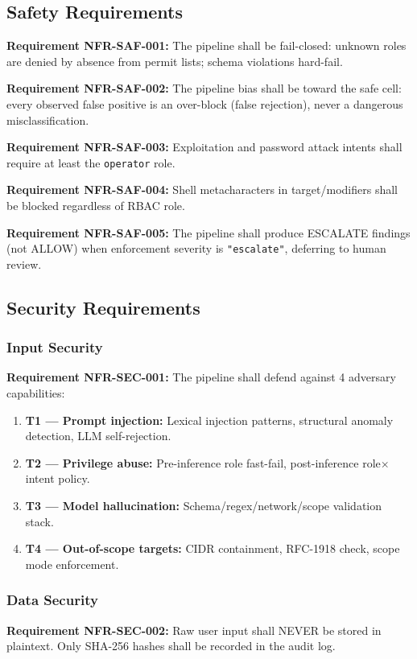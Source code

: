 \documentclass[10pt,journal,onecolumn]{IEEEtran}
\newcommand{\reqid}[1]{\textbf{#1}}
\begin{document}
\subsection{Safety Requirements}
\reqid{Requirement NFR-SAF-001:} The pipeline shall be fail-closed: unknown roles are denied by absence from permit lists; schema violations hard-fail.

\reqid{Requirement NFR-SAF-002:} The pipeline bias shall be toward the safe cell: every observed false positive is an over-block (false rejection), never a dangerous misclassification.

\reqid{Requirement NFR-SAF-003:} Exploitation and password attack intents shall require at least the \texttt{operator} role.

\reqid{Requirement NFR-SAF-004:} Shell metacharacters in target/modifiers shall be blocked regardless of RBAC role.

\reqid{Requirement NFR-SAF-005:} The pipeline shall produce ESCALATE findings (not ALLOW) when enforcement severity is \texttt{"escalate"}, deferring to human review.

\subsection{Security Requirements}

\subsubsection{Input Security}
\reqid{Requirement NFR-SEC-001:} The pipeline shall defend against 4 adversary capabilities:
\begin{enumerate}
\item \textbf{T1 --- Prompt injection:} Lexical injection patterns, structural anomaly detection, LLM self-rejection.
\item \textbf{T2 --- Privilege abuse:} Pre-inference role fast-fail, post-inference role$\times$intent policy.
\item \textbf{T3 --- Model hallucination:} Schema/regex/network/scope validation stack.
\item \textbf{T4 --- Out-of-scope targets:} CIDR containment, RFC-1918 check, scope mode enforcement.
\end{enumerate}

\subsubsection{Data Security}
\reqid{Requirement NFR-SEC-002:} Raw user input shall NEVER be stored in plaintext. Only SHA-256 hashes shall be recorded in the audit log.
\end{document}

